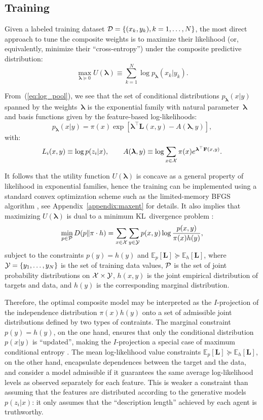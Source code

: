 \documentclass[english]{scrartcl}
\newcommand{\E}{\mathbb{E}}
\newcommand{\lda}{{\boldsymbol{\lambda}}}
\begin{document}
\subsection{Training}

Given a labeled training dataset ${\cal D}=\{(x_k, y_k), k=1,\ldots,N\}$, the most direct approach to tune the composite weights is to maximize their likelihood (or, equivalently, minimize their ``cross-entropy'') under the composite predictive distribution:
\begin{equation}
\label{eq:train_likelihood}
\max_{\lda\succeq 0} U(\lda)
\equiv\sum_{k=1}^N \log p_\lda(x_k|y_k).
\end{equation}

From~(\ref{eq:log_pool}), we see that the set of conditional distributions $p_\lda(x|y)$ spanned by the weights~$\lda$ is the exponential family with natural parameter~$\lda$ and basis functions given by the feature-based log-likelihoods:
$$
p_\lda(x|y) = \pi(x) \exp[\lda^\top \mathbf{L}(x,y) - A(\lda,y)],
$$
with:
$$
L_i(x,y) \equiv \log p(z_i|x),
\qquad
A(\lda, y) \equiv \log \sum_{x\in{\cal X}} \pi(x) e^{\lda^\top \mathbf{F}(x,y)}.
$$

It follows that the utility function $U(\lda)$ is concave as a general property of likelihood in exponential families, hence the training can be implemented using a standard convex optimization scheme such as the limited-memory BFGS algorithm \cite{Byrd-95}, see Appendix~\ref{appendix:maxent} for details. It also implies that maximizing $U(\lda)$ is dual to a minimum KL~divergence problem \cite{Csiszar-84}:
$$
\min_{p\in{\cal P}} D(p\|\pi \cdot h) = \sum_{x\in{\cal X}}\sum_{y\in{\cal Y}} p(x,y) \log \frac{p(x,y)}{\pi(x)h(y)},
$$
subject to the constraints $p(y)=h(y)$ and $\E_p[\mathbf{L}] \succeq \E_h[\mathbf{L}]$, where 
${\cal Y}=\{y_1,\ldots,y_N\}$ is the set of training data values, ${\cal P}$ is the set of joint probability distributions on ${\cal X}\times {\cal Y}$, $h(x,y)$ is the joint empirical distribution of targets and data, and $h(y)$ is the corresponding marginal distribution. 

Therefore, the optimal composite model may be interpreted as the $I$-projection of the independence distribution $\pi(x)h(y)$ onto a set of admissible joint distributions defined by two types of contraints. The marginal constraint $p(y)=h(y)$, on the one hand,  ensures that only the conditional distribution $p(x|y)$ is ``updated'', making the $I$-projection a special case of maximum conditional entropy \cite{BergerA-96}. The mean log-likelihood value constraints $\E_p[\mathbf{L}] \succeq \E_h[\mathbf{L}]$, on the other hand, encapsulate dependences between the target and the data, and consider a model admissible if it guarantees the same average log-likelihood levels as observed separately for each feature. This is weaker a constraint than assuming that the features are distributed according to the generative models $p(z_i|x)$: it only assumes that the ``description length'' \cite{Grunwald-07} achieved by each agent is truthworthy.
\end{document}
